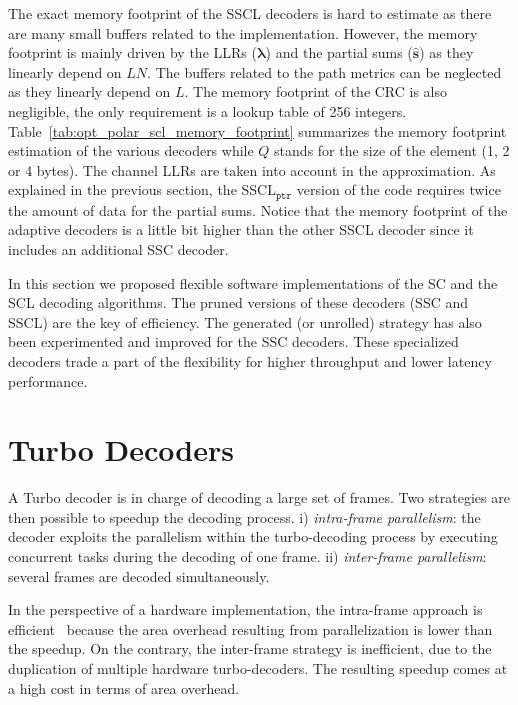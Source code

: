 The exact memory footprint of the SSCL decoders is hard to estimate as there are
many small buffers related to the implementation. However, the memory footprint
is mainly driven by the LLRs ($\bm{\lambda}$) and the partial sums
($\bm{\hat{s}}$) as they linearly depend on $LN$. The buffers related to the
path metrics can be neglected as they linearly depend on $L$. The memory
footprint of the CRC is also negligible, the only requirement is a lookup table
of 256 integers. Table~\ref{tab:opt_polar_scl_memory_footprint} summarizes the
memory footprint estimation of the various decoders while $Q$ stands for the
size of the element (1, 2 or 4 bytes). The channel LLRs are taken into account
in the approximation. As explained in the previous section, the
SSCL$_{\texttt{ptr}}$ version of the code requires twice the amount of data for
the partial sums. Notice that the memory footprint of the adaptive decoders is a
little bit higher than the other SSCL decoder since it includes an additional
SSC decoder.

In this section we proposed flexible software implementations of the SC and the
SCL decoding algorithms. The pruned versions of these decoders (SSC and SSCL)
are the key of efficiency. The generated (or unrolled) strategy has also been
experimented and improved for the SSC decoders. These specialized decoders trade
a part of the flexibility for higher throughput and lower latency performance.

\section{Turbo Decoders}

A Turbo decoder is in charge of decoding a large set of frames. Two strategies
are then possible to speedup the decoding process. i)
\textit{intra-frame parallelism}: the decoder exploits the parallelism within
the turbo-decoding process by executing concurrent tasks during
the decoding of one frame. ii) \textit{inter-frame parallelism}: several frames
are decoded simultaneously.

In the perspective of a hardware implementation, the intra-frame approach is
efficient~\cite{Muller2009} because the area overhead resulting from
parallelization is lower than the speedup. On the contrary, the inter-frame
strategy is inefficient, due to the duplication of multiple hardware
turbo-decoders. The resulting speedup comes at a high cost in terms of area
overhead.

